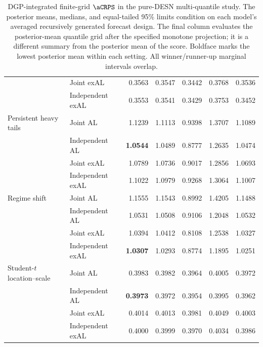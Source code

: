 \begin{table}[p]
{\begin{tabular}{@{}>{\raggedright\arraybackslash}p{}>{\raggedright\arraybackslash}p{}rrrrr@{}}
 & Joint exAL & 0.3563 & 0.3547 & 0.3442 & 0.3768 & 0.3536 \\
 & Independent exAL & 0.3553 & 0.3541 & 0.3429 & 0.3753 & 0.3452 \\
\addlinespace[2pt]
Persistent heavy tails & Joint AL & 1.1239 & 1.1113 & 0.9398 & 1.3707 & 1.1089 \\
 & Independent AL & \textbf{1.0544} & 1.0489 & 0.8777 & 1.2635 & 1.0474 \\
 & Joint exAL & 1.0789 & 1.0736 & 0.9017 & 1.2856 & 1.0693 \\
 & Independent exAL & 1.1022 & 1.0979 & 0.9268 & 1.3064 & 1.1007 \\
\addlinespace[2pt]
Regime shift & Joint AL & 1.1555 & 1.1543 & 0.8992 & 1.4205 & 1.1488 \\
 & Independent AL & 1.0531 & 1.0508 & 0.9106 & 1.2048 & 1.0532 \\
 & Joint exAL & 1.0394 & 1.0412 & 0.8108 & 1.2538 & 1.0327 \\
 & Independent exAL & \textbf{1.0307} & 1.0293 & 0.8774 & 1.1895 & 1.0251 \\
\addlinespace[2pt]
Student-\(t\) location--scale & Joint AL & 0.3983 & 0.3982 & 0.3964 & 0.4005 & 0.3972 \\
 & Independent AL & \textbf{0.3973} & 0.3972 & 0.3954 & 0.3995 & 0.3962 \\
 & Joint exAL & 0.4014 & 0.4013 & 0.3981 & 0.4049 & 0.4003 \\
 & Independent exAL & 0.4000 & 0.3999 & 0.3970 & 0.4034 & 0.3986 \\
\bottomrule
\end{tabular}
}%
\caption{DGP-integrated finite-grid \(\aCRPS\) in the pure-DESN multi-quantile study. The posterior means, medians, and equal-tailed 95\% limits condition on each model's averaged recursively generated forecast design. The final column evaluates the posterior-mean quantile grid after the specified monotone projection; it is a different summary from the posterior mean of the score. Boldface marks the lowest posterior mean within each setting. All winner/runner-up marginal intervals overlap.}
\label{tab:joint-qdesn-pure-desn-v1-score}
\end{table}
